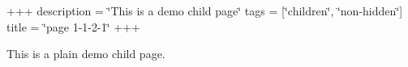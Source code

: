 +++ description = \char`\"{}\+This is a demo child page\char`\"{} tags = \mbox{[}\char`\"{}children\char`\"{}, \char`\"{}non-\/hidden\char`\"{}\mbox{]} title = \char`\"{}page 1-\/1-\/2-\/1\char`\"{} +++

This is a plain demo child page. 